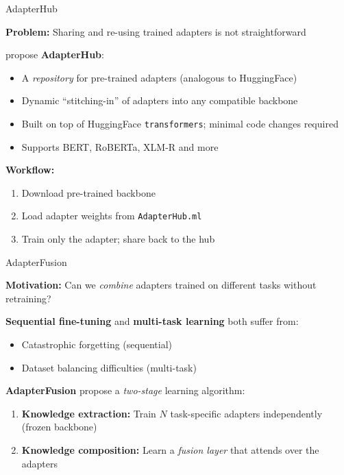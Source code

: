 \documentclass[11pt,compress,t,notes=noshow, xcolor=table]{beamer}
\begin{document}
\begin{frame}{AdapterHub}

\vfill

\textbf{Problem:} Sharing and re-using trained adapters is not straightforward

\vfill

 propose \textbf{AdapterHub}:
\begin{itemize}
  \item A \textit{repository} for pre-trained adapters (analogous to HuggingFace)
  \item Dynamic ``stitching-in'' of adapters into any compatible backbone
  \item Built on top of HuggingFace \texttt{transformers}; minimal code changes required
  \item Supports BERT, RoBERTa, XLM-R and more
\end{itemize}

\vfill

\textbf{Workflow:}
\begin{enumerate}
  \item Download pre-trained backbone
  \item Load adapter weights from \texttt{AdapterHub.ml}
  \item Train only the adapter; share back to the hub
\end{enumerate}

\vfill

\end{frame}


\begin{frame}{AdapterFusion}

\vfill

\textbf{Motivation:} Can we \textit{combine} adapters trained on different tasks without retraining?

\vfill

\textbf{Sequential fine-tuning} and \textbf{multi-task learning} both suffer from:
\begin{itemize}
  \item Catastrophic forgetting (sequential)
  \item Dataset balancing difficulties (multi-task)
\end{itemize}

\vfill

\textbf{AdapterFusion}  propose a \textit{two-stage} learning algorithm:
\begin{enumerate}
  \item \textbf{Knowledge extraction:} Train $N$ task-specific adapters independently (frozen backbone)
  \item \textbf{Knowledge composition:} Learn a \textit{fusion layer} that attends over the adapters
\end{enumerate}

\vfill

\end{frame}
\end{document}
